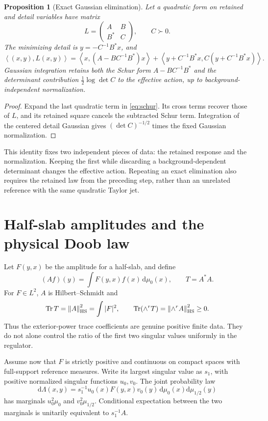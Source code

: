 \documentclass[11pt,oneside,openany]{book}
\newtheorem{proposition}[proposition]{Proposition}
\theoremstyle{definition}
\theoremstyle{remark}
\newcommand{\dd}{\mathrm d}
\newcommand{\Tr}{\operatorname{Tr}}
\newcommand{\norm}[1]{\left\lVert#1\right\rVert}
\newcommand{\ip}[2]{\left\langle#1,#2\right\rangle}
\begin{document}
\begin{proposition}[Exact Gaussian elimination]\label{prop:schur}
Let a quadratic form on retained and detail variables have matrix
\[
L=\begin{pmatrix}A&B\\B^*&C\end{pmatrix},\qquad C\succ0.
\]
The minimizing detail is $y=-C^{-1}B^*x$, and
\begin{equation}\label{eq:schur}
\ip{(x,y)}{L(x,y)}
=\ip{x}{(A-BC^{-1}B^*)x}
 +\ip{y+C^{-1}B^*x}{C(y+C^{-1}B^*x)}.
\end{equation}
Gaussian integration retains both the Schur form $A-BC^{-1}B^*$ and the determinant contribution $\frac12\log\det C$ to the effective action, up to background-independent normalization.
\end{proposition}
\begin{proof}
Expand the last quadratic term in \cref{eq:schur}. Its cross terms recover those of $L$, and its retained square cancels the subtracted Schur term. Integration of the centered detail Gaussian gives $(\det C)^{-1/2}$ times the fixed Gaussian normalization.
\end{proof}

This identity fixes two independent pieces of data: the retained response and the normalization. Keeping the first while discarding a background-dependent determinant changes the effective action. Repeating an exact elimination also requires the retained law from the preceding step, rather than an unrelated reference with the same quadratic Taylor jet.

\section{Half-slab amplitudes and the physical Doob law}
Let $F(y,x)$ be the amplitude for a half-slab, and define
\[
(Af)(y)=\int F(y,x)f(x)\,\dd\mu_0(x),\qquad T=A^*A.
\]
For $F\in L^2$, $A$ is Hilbert--Schmidt and
\begin{equation}\label{eq:HS}
\Tr T=\norm{A}_{\rm HS}^2=\int|F|^2,\qquad
\Tr(\wedge^rT)=\norm{\wedge^rA}_{\rm HS}^2\ge0.
\end{equation}
Thus the exterior-power trace coefficients are genuine positive finite data. They do not alone control the ratio of the first two singular values uniformly in the regulator.

Assume now that $F$ is strictly positive and continuous on compact spaces with full-support reference measures. Write its largest singular value as $s_1$, with positive normalized singular functions $u_0,v_0$. The joint probability law
\begin{equation}\label{eq:half-law}
\dd\Lambda(x,y)=s_1^{-1}u_0(x)F(y,x)v_0(y)
\,\dd\mu_0(x)\dd\mu_{1/2}(y)
\end{equation}
has marginals $u_0^2\mu_0$ and $v_0^2\mu_{1/2}$. Conditional expectation between the two marginals is unitarily equivalent to $s_1^{-1}A$.
\end{document}
